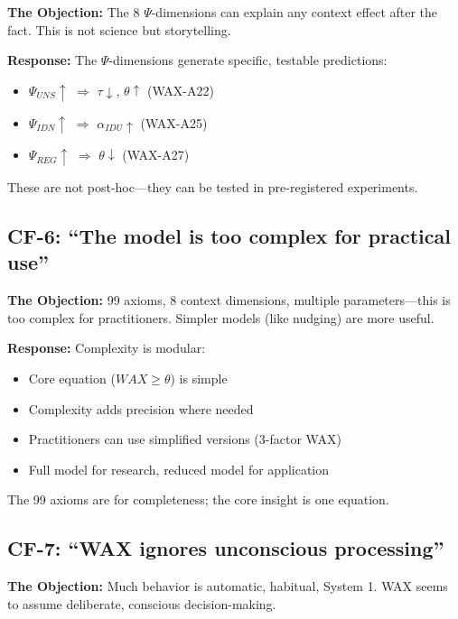 \textbf{The Objection:} The 8 $\Psi$-dimensions can explain any context effect after the fact. This is not science but storytelling.

\textbf{Response:} The $\Psi$-dimensions generate specific, testable predictions:
\begin{itemize}[nosep]
    \item $\Psi_{UNS} \uparrow$ $\Rightarrow$ $\tau \downarrow$, $\theta \uparrow$ (WAX-A22)
    \item $\Psi_{IDN} \uparrow$ $\Rightarrow$ $\alpha_{IDU} \uparrow$ (WAX-A25)
    \item $\Psi_{REG} \uparrow$ $\Rightarrow$ $\theta \downarrow$ (WAX-A27)
\end{itemize}
These are not post-hoc---they can be tested in pre-registered experiments.

\subsection{CF-6: ``The model is too complex for practical use''}

\textbf{The Objection:} 99 axioms, 8 context dimensions, multiple parameters---this is too complex for practitioners. Simpler models (like nudging) are more useful.

\textbf{Response:} Complexity is modular:
\begin{itemize}[nosep]
    \item Core equation ($WAX \geq \theta$) is simple
    \item Complexity adds precision where needed
    \item Practitioners can use simplified versions (3-factor WAX)
    \item Full model for research, reduced model for application
\end{itemize}
The 99 axioms are for completeness; the core insight is one equation.

\subsection{CF-7: ``WAX ignores unconscious processing''}

\textbf{The Objection:} Much behavior is automatic, habitual, System 1. WAX seems to assume deliberate, conscious decision-making.

